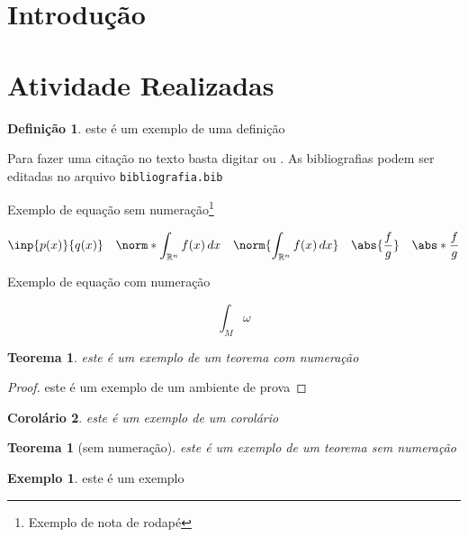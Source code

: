 \documentclass[11pt, a4paper]{article}
\newtheorem{teorema}{Teorema}[section]				%
\newtheorem*{teorema1}{Teorema}						%
\newtheorem{corolario}[teorema]{Corol\'ario}		%
\theoremstyle{definition}
\newtheorem{definicao}{Defini\c{c}\~ao}[section]	%
\newtheorem{exemplo}{Exemplo}[section]				%
\numberwithin{equation}{section}
\begin{document}
\newpage



\section{Introdução}

\lipsum[1-2]


\section{Atividade Realizadas}

\begin{definicao}
este é um exemplo de uma definição
\end{definicao}

Para fazer uma citação no texto basta digitar  ou \cite{lima2}. As bibliografias podem ser editadas no arquivo \texttt{bibliografia.bib}

Exemplo de equação sem numeração\footnote{Exemplo de nota de rodapé}

\[
 \inp{p(x)}{q(x)} \quad 
\norm*{\int_{\mathbb{R}^{n}}f(x) \, dx}		%
\quad
\norm{\int_{\mathbb{R}^{n}}f(x) \, dx}		%
\quad
\abs{\frac{f}{g}}		%
\quad
\abs*{\frac{f}{g}}		%
\]

Exemplo de equação com numeração

\begin{equation}
\int_{M}\omega
\end{equation}

\begin{teorema}
este é um exemplo de um teorema com numeração
\end{teorema}
\begin{proof}
este é um exemplo de um ambiente de prova
\end{proof}

\begin{corolario}
este é um exemplo de um corolário
\end{corolario}

\begin{teorema1}[sem numeração]
este é um exemplo de um teorema sem numeração
\end{teorema1}


\begin{exemplo}
este é um exemplo 
\end{exemplo}
\end{document}
